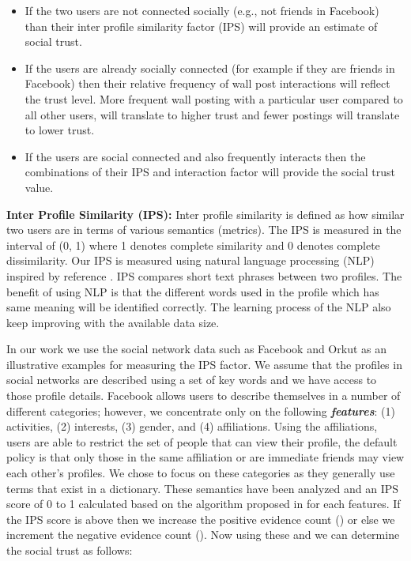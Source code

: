 \documentclass[conference]{IEEEtran}
\begin{document}
\begin{itemize}
\item If the two users are not connected socially (e.g., not friends in Facebook) than their inter profile similarity factor (IPS) will provide an estimate of social trust.
\item If the users are already socially connected (for example if they are friends in Facebook) then their relative frequency of wall post interactions will reflect the trust level. More frequent wall posting with a particular user compared to all other users, will translate to higher trust and fewer postings will translate to lower trust.
\item If the users are social connected and also frequently interacts then the combinations of their IPS and interaction factor will provide the social trust value.
\end{itemize}

{\bf Inter Profile Similarity (IPS):}
Inter profile similarity is defined as how similar two users are in terms of various semantics (metrics). The IPS is measured in the interval of (0, 1) where 1 denotes complete similarity and 0 denotes complete dissimilarity. Our IPS is measured using natural language processing (NLP) inspired by reference \cite{felix_ips}. IPS compares short text phrases between two profiles. The benefit of using NLP is that the different words used in the profile which has same meaning will be identified correctly. The learning process of the NLP also keep improving with the available data size.

In our work we use the social network data such as Facebook and Orkut as an illustrative examples for measuring the IPS factor. We assume that the profiles in social networks are described using a set of key words and we have access to those profile details. Facebook allows users to describe themselves in a number of different categories; however, we concentrate only on the following {\bf \it features}: (1) activities, (2) interests, (3) gender, and (4) affiliations. Using the affiliations, users are able to restrict the set of people that can view their profile, the default policy is that only those in the same affiliation or are immediate friends may view each other's profiles. We chose to focus on these categories as they generally use terms that exist in a dictionary.
These semantics have been analyzed and an IPS score of 0 to 1 calculated based on the algorithm proposed in \cite{felix_ips} for each features. If the IPS score is above  then we increase the positive evidence count () or else we increment the negative evidence count (). Now using these  and  we can determine the social trust as follows:
\end{document}
